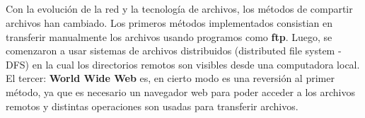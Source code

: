 \subsection{}
\subsection{}
\subsection{}
\subsection{}
\subsection{}
Con la evolución de la red y la tecnología de archivos, los métodos de compartir archivos han cambiado. Los primeros métodos implementados consistian en transferir manualmente los archivos usando programos como \textbf{ftp}. Luego, se comenzaron a usar sistemas de archivos distribuidos (distributed file system - DFS) en la cual los directorios remotos son visibles desde una computadora local. El tercer: \textbf{World Wide Web} es, en cierto modo es una reversión al primer método, ya que es necesario un navegador web para poder acceder a los archivos remotos y distintas operaciones son usadas para transferir archivos.
\printbibliography[keyword=filesystem, title=Bibliografía]
